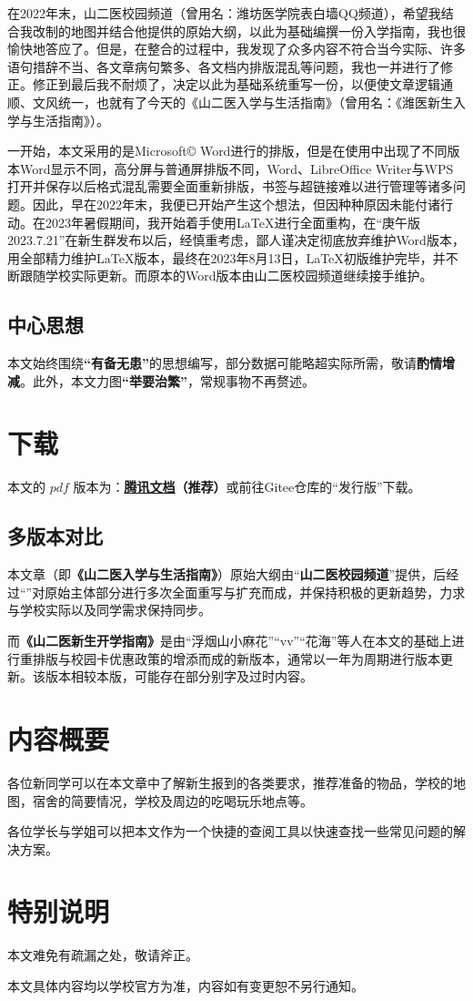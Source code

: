 在2022年末，山二医校园频道（曾用名：潍坊医学院表白墙QQ频道），希望我结合我改制的地图并结合他提供的原始大纲，以此为基础编撰一份入学指南，我也很愉快地答应了。但是，在整合的过程中，我发现了众多内容不符合当今实际、许多语句措辞不当、各文章病句繁多、各文档内排版混乱等问题，我也一并进行了修正。修正到最后我不耐烦了，决定以此为基础系统重写一份，以便使文章逻辑通顺、文风统一，也就有了今天的《山二医入学与生活指南》（曾用名：《潍医新生入学与生活指南》）。

一开始，本文采用的是Microsoft© Word进行的排版，但是在使用中出现了不同版本Word显示不同，高分屏与普通屏排版不同，Word、LibreOffice Writer与WPS打开并保存以后格式混乱需要全面重新排版，书签与超链接难以进行管理等诸多问题。因此，早在2022年末，我便已开始产生这个想法，但因种种原因未能付诸行动。在2023年暑假期间，我开始着手使用\LaTeX 进行全面重构，在“庚午版 2023.7.21”在新生群发布以后，经慎重考虑，鄙人谨决定彻底放弃维护Word版本，用全部精力维护\LaTeX 版本，最终在2023年8月13日，\LaTeX 初版维护完毕，并不断跟随学校实际更新。而原本的Word版本由山二医校园频道继续接手维护。

\subsection[中心思想]{中心思想}
本文始终围绕\textbf{“有备无患”}的思想编写，部分数据可能略超实际所需，敬请\textbf{酌情增减}。此外，本文力图\textbf{“举要治繁”}，常规事物不再赘述。

\section[下载]{下载}
本文的 $pdf$ 版本\textbf{}为：\textbf{\uline{\href{https://docs.qq.com/s/ETcQ-ZFSrSsh6MK9bm773q}{腾讯文档}}（推荐）}或前往Gitee仓库的“发行版”下载。


\subsection[多版本对比]{多版本对比}
本文章（即\textbf{《山二医入学与生活指南》}）原始大纲由“\textbf{山二医校园频道}”提供，后经过“\textbf{}”对原始主体部分进行多次全面重写与扩充而成，并保持积极的更新趋势，力求与学校实际以及同学需求保持同步。

而\textbf{《山二医新生开学指南》}是由“浮烟山小麻花”“vv”“花海”等人在本文的基础上进行重排版与校园卡优惠政策的增添而成的新版本，通常以一年为周期进行版本更新。该版本相较本版，可能存在部分别字及过时内容。

\textbf{}

\section[内容概要]{内容概要}

各位新同学可以在本文章中了解新生报到的各类要求，推荐准备的物品，学校的地图，宿舍的简要情况，学校及周边的吃喝玩乐地点等。

各位学长与学姐可以把本文作为一个快捷的查阅工具以快速查找一些常见问题的解决方案。

\section[特别说明]{特别说明}
本文难免有疏漏之处，敬请斧正。

本文具体内容均以学校官方为准，内容如有变更恕不另行通知。